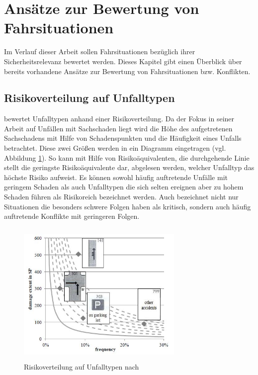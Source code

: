 \section{Ansätze zur Bewertung von Fahrsituationen}
Im Verlauf dieser Arbeit sollen Fahrsituationen bezüglich ihrer Sicherheitsrelevanz bewertet werden. Dieses Kapitel gibt einen Überblick über bereits vorhandene Ansätze zur Bewertung von Fahrsituationen bzw. Konflikten. %

\subsection{Risikoverteilung auf Unfalltypen}
\Textcite[S. 60]{Gschwendtner.2015} bewertet Unfalltypen anhand einer Risikoverteilung. Da der Fokus in seiner Arbeit auf Unfällen mit Sachschaden liegt wird die Höhe des aufgetretenen Sachschadens mit Hilfe von Schadenspunkten und die Häufigkeit eines Unfalls betrachtet. Diese zwei Größen werden in ein Diagramm eingetragen (vgl. Abbildung \ref{fig:Risikoverteilung}). So kann mit Hilfe von Risikoäquivalenten, die durchgehende Linie stellt die geringste Risikoäquivalente dar, abgelesen werden, welcher Unfalltyp das höchste Risiko aufweist. Es können sowohl häufig auftretende Unfälle mit geringem Schaden als auch Unfalltypen die sich selten ereignen aber zu hohem Schaden führen als Risikoreich bezeichnet werden. Auch \Textcite[S. 14]{Mages.2008} bezeichnet nicht nur Situationen die besonders schwere Folgen haben als kritisch, sondern auch häufig auftretende Konflikte mit geringeren Folgen.

\begin{savenotes}
	\begin{figure}[H]
		\centering
		\includegraphics[width=8cm,height=7cm]{figures/Risikoverteilung}
		\caption[Risikoverteilung auf Unfalltypen.]{Risikoverteilung auf Unfalltypen nach \parencite[S. 376]{Gschwendtner.2014}}\label{fig:Risikoverteilung}
	\end{figure}
\end{savenotes}

